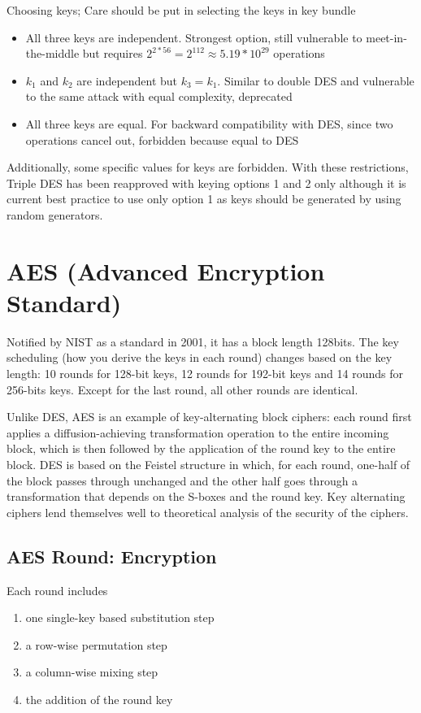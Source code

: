 Choosing keys; Care should be put in selecting the keys in key bundle
\begin{itemize}
	\item All three keys are independent. Strongest option, still vulnerable to meet-in-the-middle but requires $2^{2*56} = 2^{112} \approx 5.19 * 10^{29}$ operations
	\item $k_1$ and $k_2$ are independent but $k_3=k_1$. Similar to double DES and vulnerable to the same attack with equal complexity, deprecated
	\item All three keys are equal. For backward compatibility with DES, since two operations cancel out, forbidden because equal to DES
\end{itemize}

Additionally, some specific values for keys are forbidden. With these restrictions, Triple DES has been reapproved with keying options 1 and 2 only although it is current best practice to use only option 1 as keys should be generated by using random generators.


\section{AES (Advanced Encryption Standard)}

Notified by NIST as a standard in 2001, it has a block length 128bits. The key scheduling (how you derive the keys in each round) changes based on the key length: 10 rounds for 128-bit keys, 12 rounds for 192-bit keys and 14 rounds for 256-bits keys. Except for the last round, all other rounds are identical. 


Unlike DES, AES is an example of key-alternating block ciphers: each round first applies a diffusion-achieving transformation operation to the entire incoming block, which is then followed by the application of the round key to the entire block.
DES is based on the Feistel structure in which, for each round, one-half of the block passes through unchanged and the other half goes through a transformation that depends on the S-boxes and the round key.
Key alternating ciphers lend themselves well to theoretical analysis of the security of the ciphers.

\subsection{AES Round: Encryption}

Each round includes
\begin{enumerate}
	\item one single-key based substitution step
	\item a row-wise permutation step
	\item a column-wise mixing step
	\item the addition of the round key
\end{enumerate}

